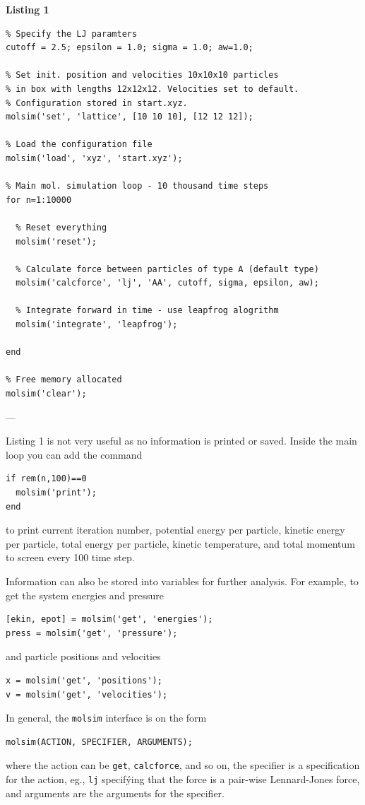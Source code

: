 \documentclass[11pt]{article}
\begin{document}
\bigskip

\noindent \textbf{Listing 1}
\begin{verbatim}
% Specify the LJ paramters
cutoff = 2.5; epsilon = 1.0; sigma = 1.0; aw=1.0;

% Set init. position and velocities 10x10x10 particles 
% in box with lengths 12x12x12. Velocities set to default. 
% Configuration stored in start.xyz. 
molsim('set', 'lattice', [10 10 10], [12 12 12]);

% Load the configuration file
molsim('load', 'xyz', 'start.xyz');

% Main mol. simulation loop - 10 thousand time steps
for n=1:10000

  % Reset everything
  molsim('reset');

  % Calculate force between particles of type A (default type)
  molsim('calcforce', 'lj', 'AA', cutoff, sigma, epsilon, aw);

  % Integrate forward in time - use leapfrog alogrithm
  molsim('integrate', 'leapfrog');
 
end

% Free memory allocated
molsim('clear');
\end{verbatim}
---

\noindent Listing 1 is not very useful as no information is printed or saved. Inside the
main loop you can add the command
\begin{verbatim}
if rem(n,100)==0
  molsim('print');
end
\end{verbatim}
to print current iteration number, potential energy per particle, kinetic energy
per particle, total energy per particle, kinetic temperature, and total momentum
to screen every 100 time step.

Information can also be stored into variables for further analysis. For example,
to get the system energies and pressure
\begin{verbatim}
[ekin, epot] = molsim('get', 'energies');
press = molsim('get', 'pressure');
\end{verbatim}
and particle positions and velocities
\begin{verbatim}
x = molsim('get', 'positions');
v = molsim('get', 'velocities');
\end{verbatim}

\bigskip

\noindent In general, the \verb!molsim! interface is on the form
\begin{verbatim}
molsim(ACTION, SPECIFIER, ARGUMENTS);
\end{verbatim}
where the action can be \verb!get!, \verb!calcforce!, and so on, the specifier
is a specification for the action, eg., \verb!lj! specifýing that the force is a
pair-wise Lennard-Jones force, and arguments are the arguments for the
specifier.
\end{document}
